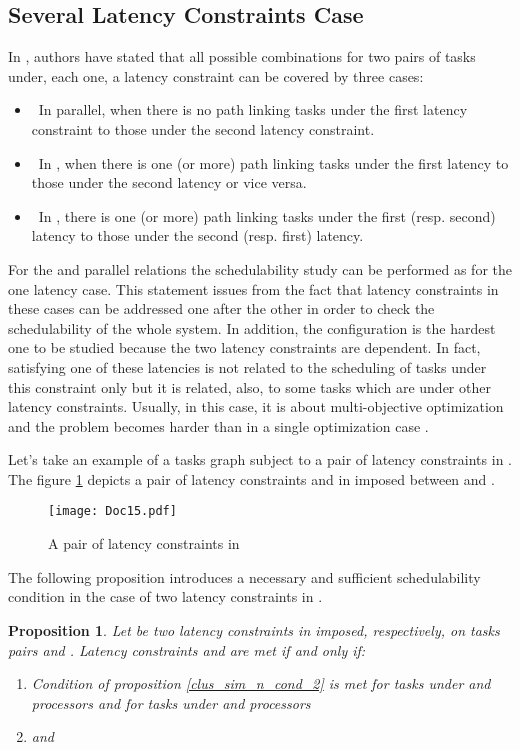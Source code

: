\documentclass{ijcaArticle}
\newtheorem{Proposition}{Proposition}
\begin{document}
\subsection{Several Latency Constraints Case}

In \cite{cucu04}, authors have stated that all possible combinations for two pairs of tasks under,
each one, a latency constraint can be covered by three cases:
\begin{itemize}
\item \ In parallel, when there is no path linking tasks under the first latency constraint to those under the second latency constraint.

\item  \ In , when there is one (or more) path linking tasks under the first latency to those under the second latency or vice versa. 
\item  \ In , there is one (or more) path linking tasks under the first (resp. second) latency to those under the second (resp. first) latency. 
\end{itemize}
For the  and parallel relations the schedulability study can be performed as for the one latency case. This statement issues from the fact that latency constraints in these cases can be addressed one after the other in order to check the schedulability of the whole system. In addition, the  configuration is the hardest one to be studied because the two latency constraints are dependent. In fact, satisfying one of these latencies is not related to the scheduling of tasks under this constraint only but it is related, also, to some tasks which are under other latency constraints. Usually, in this case, it is about multi-objective optimization and the problem becomes harder than in a single optimization case \cite{GlaBer:2010}.
 


Let's take an example of a tasks graph subject to  a pair of latency constraints in . The figure \ref{fig-lat-crois} depicts a pair of latency constraints  and  in  imposed between  and .

\begin{figure}[h!] 
\begin{center} 
\texttt{[image: Doc15.pdf]} 
\caption{A pair of latency constraints in } 
\label{fig-lat-crois} 
\end{center} 
\end{figure}


The following proposition introduces a necessary and sufficient schedulability condition in the case of two latency constraints in .
\vskip2mm
\begin{Proposition}\label{th_X}
  Let  be two latency constraints in  imposed, respectively, on tasks pairs  and . Latency constraints   and  are met if and only if: 
\begin{enumerate}
\item Condition of proposition \ref{clus_sim_n_cond_2} is met for tasks under  and  processors and for tasks under  and  processors
\item  and


\end{enumerate}
   
  
\end{Proposition} 
\end{document}
